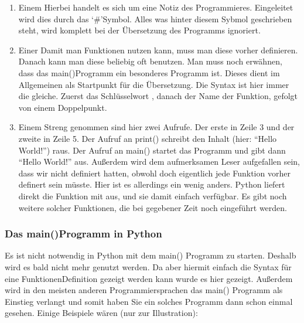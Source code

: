 \documentclass[letterpaper,10pt,english]{jupyterBook}
\begin{document}
\begin{enumerate}
%
\item {} 
\sphinxAtStartPar
Einem  Hierbei handelt es sich um eine Notiz des Programmieres. Eingeleitet wird dies durch das ‘\#’\sphinxhyphen{}Symbol. Alles was hinter diesem Sybmol geschrieben steht, wird komplett bei der Übersetzung des Programms ignoriert.

\item {} 
\sphinxAtStartPar
Einer  Damit man Funktionen nutzen kann, muss man diese vorher definieren. Danach kann man diese beliebig oft benutzen. Man muss noch erwähnen, dass das main()\sphinxhyphen{}Programm ein besonderes Programm ist. Dieses dient im Allgemeinen als Startpunkt für die Übersetzung. Die Syntax ist hier immer die gleiche. Zuerst das Schlüsselwort , danach der Name der Funktion, gefolgt von einem Doppelpunkt.

\item {} 
\sphinxAtStartPar
Einem  Streng genommen sind hier zwei Aufrufe. Der erste in Zeile 3 und der zweite in Zeile 5. Der Aufruf an print() schreibt den Inhalt (hier: “Hello World!”) raus. Der Aufruf an main() startet das Programm und gibt dann “Hello World!” aus. Außerdem wird dem aufmerksamen Leser aufgefallen sein, dass wir  nicht definiert hatten, obwohl doch eigentlich jede Funktion vorher definert sein müsste. Hier ist es allerdings ein wenig anders. Python liefert direkt die \sphinxhyphen{}Funktion mit aus, und sie damit einfach verfügbar. Es gibt noch weitere solcher Funktionen, die bei gegebener Zeit noch eingeführt werden.

\end{enumerate}
\subsubsection*{Das main()\sphinxhyphen{}Programm in Python}

\sphinxAtStartPar
Es ist nicht notwendig in Python mit dem main() Programm zu starten. Deshalb wird es bald nicht mehr genutzt werden. Da aber hiermit einfach die Syntax für eine Funktionen\sphinxhyphen{}Definition gezeigt werden kann wurde es hier gezeigt. Außerdem wird in den meisten anderen Programmiersprachen das main() Programm als Einstieg verlangt und somit haben Sie ein solches Programm dann schon einmal gesehen. Einige Beispiele wären (nur zur Illustration):
\end{document}
